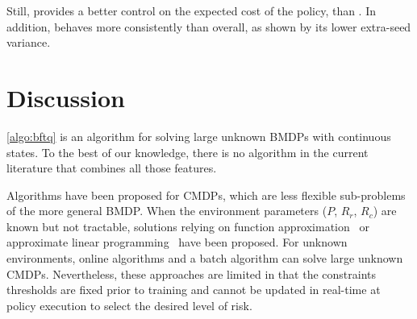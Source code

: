 Still, \BFTQ provides a better control on the expected cost of the policy, than \FTQl. In addition, \BFTQ behaves more consistently than \FTQl overall, as shown by its lower extra-seed variance.


\section{Discussion}
\label{subsec:discussions}
\autoref{algo:bftq} is an algorithm for solving large unknown BMDPs with continuous states. To the best of our knowledge, there is no algorithm in the current literature that combines all those features.


Algorithms have been proposed for CMDPs, which are less flexible sub-problems of the more general BMDP. When the environment parameters ($P$, $R_r$, $R_c$) are known but not tractable, solutions relying on function approximation~\citep{Undurti} or approximate linear programming~\citep{Poupart2015} have been proposed. For unknown environments, online algorithms \citep{Geibel2005, Abe2010,ChowGJP15,AchiamHTA17} and a batch algorithm \citep{Thomas2015, Petrik2016, Laroche2019,le2019batch} can solve large unknown CMDPs. Nevertheless, these approaches are limited in that the constraints thresholds are fixed prior to training and cannot be updated in real-time at policy execution to select the desired level of risk.

